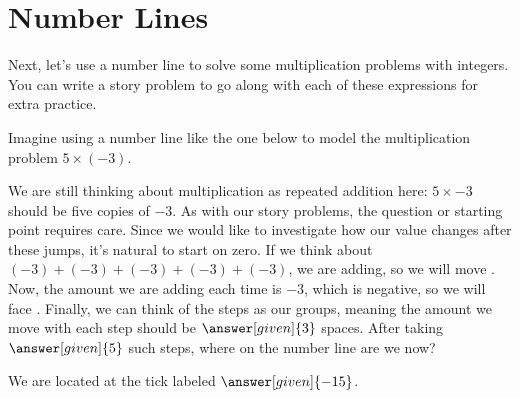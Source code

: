 \documentclass{ximera}
\begin{document}
\section{Number Lines}

Next, let's use a number line to solve some multiplication problems with integers.  You can write 
a story problem to go along with each of these expressions for extra practice.

\begin{example}
Imagine using a number line like the one below to model the multiplication problem $5 \times (-3) $.
\begin{center}
\end{center}
We are still thinking about multiplication as repeated addition here: $5 \times -3$ should be five copies of $-3$.  As with our story problems, the question or starting point requires care.  Since we would like to investigate how our value changes after these jumps, it's natural to start on zero. If we think about $(-3) + (-3) + (-3) + (-3) + (-3)$, we 
are adding, so we will move .  Now, the amount we are adding each time is $-3$, which is negative, so we will face  . Finally, we can think of the steps as our groups, meaning the amount we move with each step should be $\answer[given]{3}$ spaces. After taking $\answer[given]{5}$ such steps,  where on the number line are we now? 

\begin{prompt}
We are located at the tick labeled $\answer[given]{-15}$.
\end{prompt}
\end{example}
\end{document}
